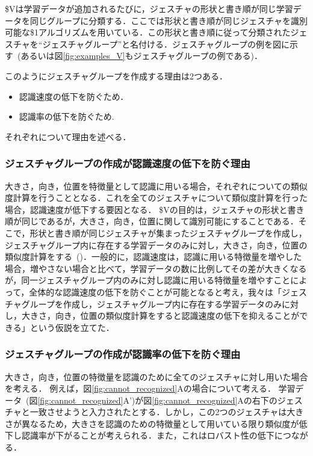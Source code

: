 \$Vは学習データが追加されるたびに，ジェスチャの形状と書き順が同じ学習データを同じグループに分類する．ここでは形状と書き順が同じジェスチャを識別可能な\$1アルゴリズムを用いている．この形状と書き順に従って分類されたジェスチャを``ジェスチャグループ''と名付ける．ジェスチャグループの例を図に示す~(あるいは図\ref{fig:examples_V}もジェスチャグループの例である)．

このようにジェスチャグループを作成する理由は2つある．
\begin{itemize}
\item 認識速度の低下を防ぐため．
\item 認識率の低下を防ぐため.
\end{itemize}
それぞれについて理由を述べる．


\subsubsection{ジェスチャグループの作成が認識速度の低下を防ぐ理由}

大きさ，向き，位置を特徴量として認識に用いる場合，それぞれについての類似度計算を行うこととなる．これを全てのジェスチャについて類似度計算を行った場合，認識速度が低下する要因となる．
\$Vの目的は，ジェスチャの形状と書き順が同じであるが，大きさ，向き，位置に関して識別可能にすることである．そこで，形状と書き順が同じジェスチャが集まったジェスチャグループを作成し，ジェスチャグループ内に存在する学習データのみに対し，大きさ，向き，位置の類似度計算をする~()．一般的に，認識速度は，認識に用いる特徴量を増やした場合，増やさない場合と比べて，学習データの数に比例してその差が大きくなるが，同一ジェスチャグループ内のみに対し認識に用いる特徴量を増やすことによって，全体的な認識速度の低下を防ぐことが可能となると考え，我々は「ジェスチャグループを作成し，ジェスチャグループ内に存在する学習データのみに対し，大きさ，向き，位置の類似度計算をすると認識速度の低下を抑えることができる」という仮説を立てた．

\subsubsection{ジェスチャグループの作成が認識率の低下を防ぐ理由}

大きさ，向き，位置の特徴量を認識のために全てのジェスチャに対し用いた場合を考える．
例えば，図\ref{fig:cannot_recognized}Aの場合について考える．
学習データ~(図\ref{fig:cannot_recognized}A')が図\ref{fig:cannot_recognized}Aの右下のジェスチャと一致させようと入力されたとする．しかし，この2つのジェスチャは大きさが異なるため，大きさを認識のための特徴量として用いている限り類似度が低下し認識率が下がることが考えられる．また，これはロバスト性の低下につながる．


